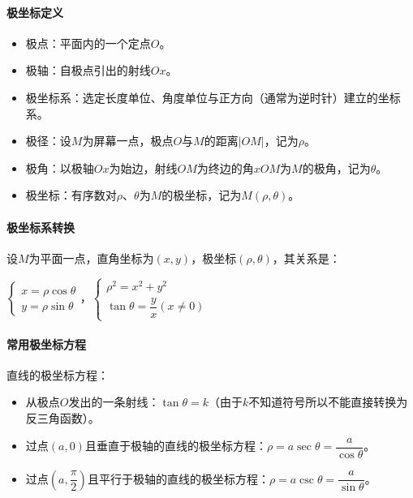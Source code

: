 \paragraph{极坐标定义} \leavevmode \medskip

\begin{itemize}
    \item 极点：平面内的一个定点$O$。
    \item 极轴：自极点引出的射线$Ox$。
    \item 极坐标系：选定长度单位、角度单位与正方向（通常为逆时针）建立的坐标系。
    \item 极径：设$M$为屏幕一点，极点$O$与$M$的距离$\vert OM\vert$，记为$\rho$。
    \item 极角：以极轴$Ox$为始边，射线$OM$为终边的角$xOM$为$M$的极角，记为$\theta$。
    \item 极坐标：有序数对$\rho$、$\theta$为$M$的极坐标，记为$M(\rho,\theta)$。
\end{itemize}

\paragraph{极坐标系转换} \leavevmode \medskip

设$M$为平面一点，直角坐标为$(x,y)$，极坐标$(\rho,\theta)$，其关系是：\medskip

$\left\{\begin{array}{l}
    x=\rho\cos\theta \\
    y=\rho\sin\theta
\end{array}\right.$，$\left\{\begin{array}{l}
    \rho^2=x^2+y^2 \\
    \tan\theta=\dfrac{y}{x}(x\neq0)
\end{array}\right.$\medskip

\paragraph{常用极坐标方程} \leavevmode \medskip

直线的极坐标方程：

\begin{itemize}
    \item 从极点$O$发出的一条射线：$\tan\theta=k$（由于$k$不知道符号所以不能直接转换为反三角函数）。
    \item 过点$(a,0)$且垂直于极轴的直线的极坐标方程：$\rho=a\sec\theta=\dfrac{a}{\cos\theta}$。
    \item 过点$\left(a,\dfrac{\pi}{2}\right)$且平行于极轴的直线的极坐标方程：$\rho=a\csc\theta=\dfrac{a}{\sin\theta}$。
\end{itemize}


